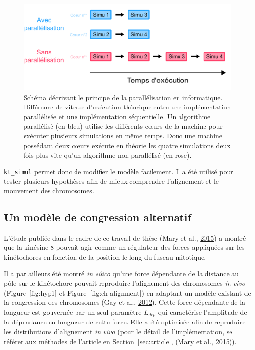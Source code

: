 \documentclass[12pt,a4paper,twoside,openright]{book}
\begin{document}
\begin{figure}[htbp]
\centering
\includegraphics{figures/results/modelling/parallel.png}
\caption{\label{fig:parallel}Schéma décrivant le principe de la
parallélisation en informatique. Différence de vitesse d'exécution
théorique entre une implémentation parallélisée et une implémentation
séquentielle. Un algorithme parallélisé (en bleu) utilise les différents
cœurs de la machine pour exécuter plusieurs simulations en même temps.
Donc une machine possédant deux cœurs exécute en théorie les quatre
simulations deux fois plus vite qu'un algorithme non parallélisé (en
rose).}
\end{figure}

\texttt{kt\_simul} permet donc de modifier le modèle facilement. Il a
été utilisé pour tester plusieurs hypothèses afin de mieux comprendre
l'alignement et le mouvement des chromosomes.

\subsection{Un modèle de congression
alternatif}\label{un-moduxe8le-de-congression-alternatif}

\label{sec:second-modele}

L'étude publiée dans le cadre de ce travail de thèse (Mary et al.,
\protect\hyperlink{ref-Mary2015}{2015}) a montré que la kinésine-8
pouvait agir comme un régulateur des forces appliquées sur les
kinétochores en fonction de la position le long du fuseau mitotique.

Il a par ailleurs été montré \emph{in silico} qu'une force dépendante de
la distance au pôle sur le kinétochore pouvait reproduire l'alignement
des chromosomes \emph{in vivo} (Figure~\ref{fig:hyp1} et
Figure~\ref{fig:ch-alignment}) en adaptant un modèle existant de la
congression des chromosomes (Gay et al.,
\protect\hyperlink{ref-Gay2012a}{2012}). Cette force dépendante de la
longueur est gouvernée par un seul paramètre \(L_{dep}\) qui caractérise
l'amplitude de la dépendance en longueur de cette force. Elle a été
optimisée afin de reproduire les distributions d'alignement \emph{in
vivo} (pour le détail de l'implémentation, se référer aux méthodes de
l'article en Section~\ref{sec:article}, (Mary et al.,
\protect\hyperlink{ref-Mary2015}{2015})).
\end{document}
